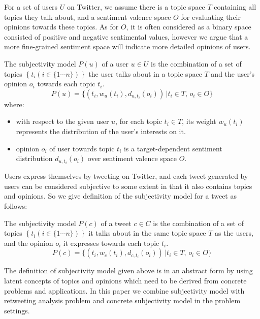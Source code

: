 \documentclass[smallcondensed]{svjour3}     %
\begin{document}
For a set of users $U$ on Twitter, we assume there is a topic space $T$ containing all topics they talk about, and a sentiment valence space $O$ for evaluating their opinions towards these topics. As for $O$, it is often considered as a binary space consisted of positive and negative sentimental values, however we argue that a more fine-grained sentiment space will indicate more detailed opinions of users. 
\begin{definition}
The subjectivity model  $ P \left( u \right) $ of a user $u \in U $ is the combination of a set of topics $\left\lbrace  t_{i} \left( i \in \lbrace1 \cdots n \rbrace \right)  \right\rbrace $ the user talks about in a topic space $T$ and the user's opinion $o_{i}$ towards each topic $ t_{i} $. 
\begin{equation}
\label{usermodel}
P \left( u \right) = \lbrace \left( t_{i}, w_{u} \left( t_{i} \right), d_{u,t_{i}} \left( o_{i} \right) \right) \,\vert  t_{i} \in T, \, o_{i} \in O \rbrace
\end{equation}
where:
\begin{itemize}
\item with respect to the given user $u$,  for each topic $t_{i} \in T$, its  weight $ w_{u} \left( t_{i} \right)$ represents the distribution of the user's interests on it.
\item opinion $o_{i}$ of user towards topic $t_{i}$ is a target-dependent sentiment distribution  $d_{u,t_{i}} \left( o_{i} \right)$ over sentiment valence space $O$.
\end{itemize}
\end{definition}
Users express themselves by tweeting on Twitter, and each tweet generated by users can be considered subjective to some extent in that it also contains topics and opinions. So we give definition of the subjectivity model  for a tweet as follows:
\begin{definition}  
The subjectivity model  $ P \left( c \right)  $ of a tweet $c \in C$ is the combination of a set of topics $\left\lbrace t_{i} \left( i \in \lbrace1 \cdots n \rbrace \right)  \right\rbrace$ it talks about in the same topic space $T$ as the users, and the opinion $o_{i}$ it expresses towards each topic $ t_{i} $.
\begin{equation}
\label{tweetmodel}
P \left( c \right) = \lbrace \left( t_{i}, w_{c} \left( t_{i} \right), d_{c,t_{i}} \left( o_{i} \right) \right) \,\vert  t_{i} \in T, \, o_{i} \in O \rbrace
\end{equation}
\end{definition}
The definition of subjectivity model  given above is in an abstract form by using latent concepts of topics and opinions which need to be derived from concrete problems and applications. In this paper we combine subjectivity model  with retweeting analysis problem and concrete subjectivity model  in the problem settings.  
\end{document}
